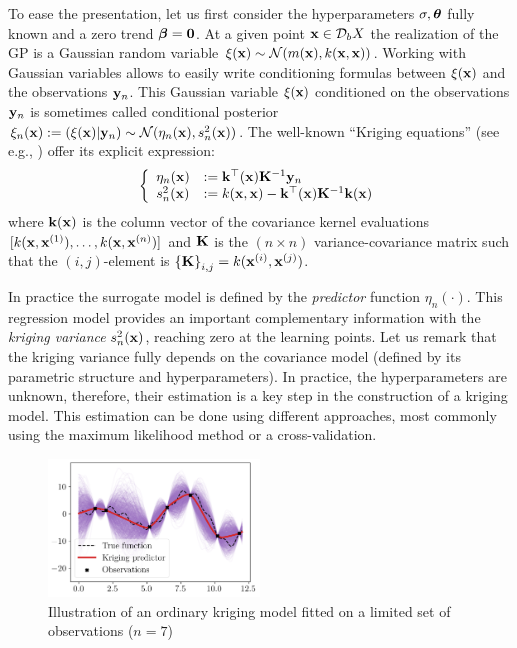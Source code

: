 To ease the presentation, let us first consider the hyperparameters $\sigma, {\boldsymbol{\theta}}$ fully known and a zero trend ${\boldsymbol{\beta}} = \textbf{0}$.
At a given point ${\bf x} \in \mathcal{D}_bX$ the realization of the GP is a Gaussian random variable $\xi({\bf x}) \sim \mathcal{N}(m({\bf x}), k({\bf x}, {\bf x}))$. 
Working with Gaussian variables allows to easily write conditioning formulas between $\xi({\bf x})$ and the observations ${\bf y}_n$.
This Gaussian variable $\xi({\bf x})$ conditioned on the observations ${\bf y}_n$ is sometimes called conditional posterior $\xi_n({\bf x}) := (\xi({\bf x}) | {\bf y}_n) \sim \mathcal{N}(\eta_n({\bf x}), s_n^2({\bf x}))$. 
The well-known ``Kriging equations'' (see e.g., \cite{rasmussen_2006}) offer its explicit expression:
\begin{equation}
    \left\{
    \begin{array}{ll}
        \eta_n({\bf x}) &:= {\bf k}^\top({\bf x}) {\bf K}^{-1} {\bf y}_n\\
        s_n^2({\bf x}) &:= k({\bf x}, {\bf x}) - {\bf k}^\top({\bf x}) {\bf K}^{-1} {\bf k}({\bf x})
    \end{array}
\right.
\label{eq:kriging}
\end{equation}
where ${\bf k}({\bf x})$ is the column vector of the covariance kernel evaluations $[k({\bf x}, {\bf x}^{(1)}), \dots,\allowbreak k({\bf x}, {\bf x}^{(n)})]$ and ${\bf K}$ is the $(n \times n)$ 
variance-covariance matrix such that the $(i, j)$-element is $\left\{{\bf K} \right\}_{i, j}=k({\bf x}^{(i)}, {\bf x}^{(j)})$.

In practice the surrogate model is defined by the \textit{predictor} function $\eta_n(\cdot)$. 
This regression model provides an important complementary information with the \textit{kriging variance} $s_n^2({\bf x})$, reaching zero at the learning points.
Let us remark that the kriging variance fully depends on the covariance model (defined by its parametric structure and hyperparameters). 
In practice, the hyperparameters are unknown, therefore, their estimation is a key step in the construction of a kriging model. 
This estimation can be done using different approaches, most commonly using the maximum likelihood method or a cross-validation.


\begin{figure}[ht]
    \centering
    \includegraphics[width=0.5\textwidth]{../numerical_experiments/chapter1/figures/kriging_1D.png}
    \caption{Illustration of an ordinary kriging model fitted on a limited set of observations ($n=7$)}
    \label{fig:kriging_1D}
\end{figure}




